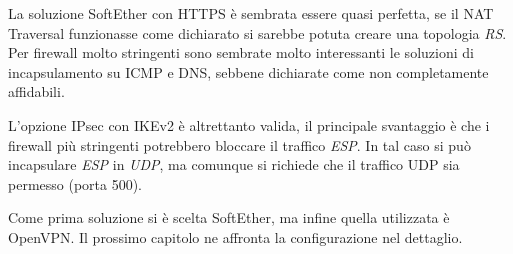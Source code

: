 La soluzione SoftEther con HTTPS è sembrata essere quasi perfetta, se il NAT Traversal
funzionasse come dichiarato si sarebbe potuta creare una topologia \textit{RS}.
Per firewall molto stringenti sono sembrate molto interessanti le soluzioni di incapsulamento
su ICMP  e DNS, sebbene dichiarate come non completamente affidabili.

L'opzione IPsec con IKEv2 è altrettanto valida, il principale svantaggio è che i firewall più stringenti
potrebbero bloccare il traffico \textit{ESP}. In tal caso si può incapsulare \textit{ESP} in \textit{UDP},
ma comunque si richiede che il traffico UDP sia permesso (porta 500).

Come prima soluzione si è scelta SoftEther, ma infine quella utilizzata è OpenVPN. Il
prossimo capitolo ne affronta la configurazione nel dettaglio.
